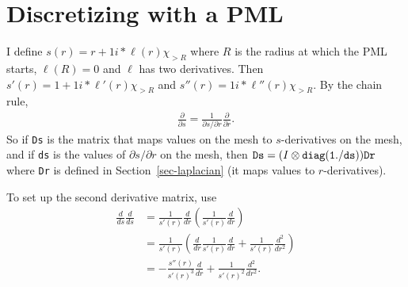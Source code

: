 \section{Discretizing with a PML}
\label{sec-pml}

I define $s(r) = r + 1i*\ell(r)\chi_{>R}$ where $R$ is the radius
at which the PML starts, $\ell(R) = 0$ and $\ell$ has two derivatives.
Then $s'(r) = 1 + 1i*\ell'(r)\chi_{>R}$ and
$s''(r) = 1i*\ell''(r)\chi_{>R}$. 
By the chain rule, 
\begin{align*}
 \frac{\partial}{\partial s} 
  = \frac{1}{\partial s/\partial r} \frac{\partial}{\partial r}.
\end{align*}
So if {\tt Ds} is the matrix that maps values on the mesh to
$s$-derivatives on the mesh, and if {\tt ds} is the values of $\partial s/\partial r$
on the mesh, then 
${\tt Ds} = (I \otimes {\tt diag(1./ds)}){\tt Dr}$ where {\tt Dr} is defined in
Section~\ref{sec-laplacian} (it maps values to $r$-derivatives).

To set up the second derivative matrix, use
\begin{align*}
 \frac{d}{ds}\frac{d}{ds}
 &= \frac{1}{s'(r)}\frac{d}{dr}\left(\frac{1}{s'(r)}\frac{d}{dr}\right) \\
 &= \frac{1}{s'(r)}\left(\frac{d}{dr}\frac{1}{s'(r)}\frac{d}{dr} +
       \frac{1}{s'(r)}\frac{d^2}{dr^2} \right) \\
 &= -\frac{s''(r)}{s'(r)^3}\frac{d}{dr} + \frac{1}{s'(r)^2}\frac{d^2}{dr^2}.
\end{align*}


